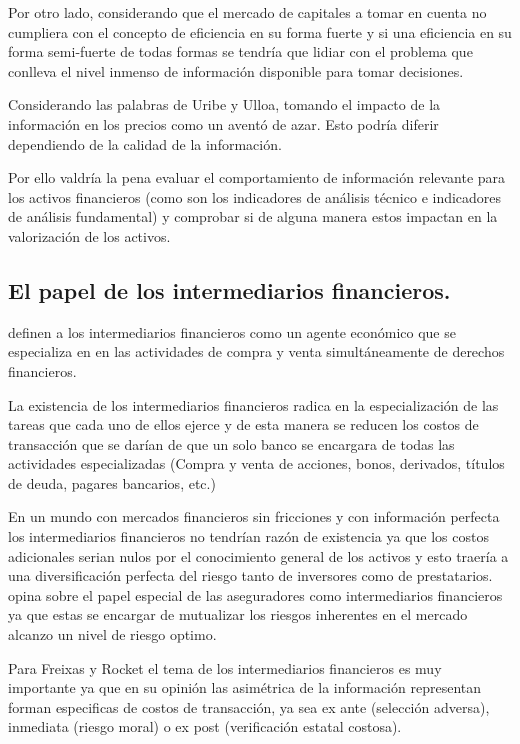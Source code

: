 \documentclass[letterpaper,12pt,oneside]{book}
\begin{document}
Por otro lado, considerando que el mercado de capitales a tomar en cuenta no cumpliera con el concepto de eficiencia en su forma fuerte y si una eficiencia en su forma semi-fuerte de todas formas se tendría que lidiar con el problema que conlleva el nivel inmenso de información disponible para tomar decisiones.

Considerando las palabras de Uribe y Ulloa, tomando el impacto de la información en los precios como un aventó de azar. Esto podría diferir dependiendo de la calidad de la información.


Por ello valdría la pena evaluar el comportamiento de información relevante para los activos financieros (como son los indicadores de análisis técnico e indicadores de análisis fundamental) y comprobar si de alguna manera estos impactan en la valorización de los activos.



\subsection{El papel de los intermediarios financieros.}
\cite{c2} definen a los intermediarios financieros como un agente económico que se especializa en en las actividades de compra y venta simultáneamente de derechos financieros.

La existencia de los intermediarios financieros radica en la especialización de las tareas que cada uno de ellos ejerce y de esta manera se reducen los costos de transacción que se darían de que un solo banco se encargara de todas las actividades especializadas (Compra y venta de acciones, bonos, derivados, títulos de deuda, pagares bancarios, etc.)

En un mundo con mercados financieros sin fricciones y con información perfecta los intermediarios financieros no tendrían razón de existencia ya que los costos adicionales serian nulos por el conocimiento general de los activos y esto traería a una diversificación perfecta del riesgo tanto de inversores como de prestatarios. \cite{c1} opina sobre el papel especial de las aseguradores como intermediarios financieros ya que estas se encargar de mutualizar los riesgos inherentes en el mercado alcanzo un nivel de riesgo optimo.

Para Freixas y Rocket el tema de los intermediarios financieros es muy importante ya que en su opinión las asimétrica de la información representan forman especificas de costos de transacción, ya sea ex ante (selección adversa), inmediata (riesgo moral) o ex post (verificación estatal costosa).
\end{document}
